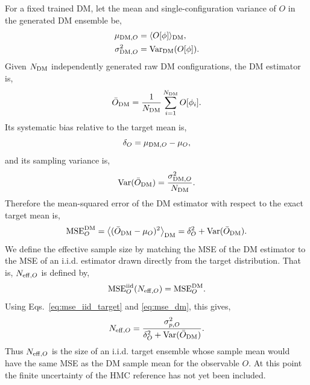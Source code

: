 \documentclass[reprint,twocolumn,superscriptaddress,preprintnumbers,amsmath,amssymb,aps,prd,floatfix]{revtex4-2}
\begin{document}
For a fixed trained DM, let the mean and single-configuration variance of $O$ in the generated DM ensemble be,
\begin{equation}
\begin{aligned}
\mu_{{\rm DM},O}
&=
\langle O[\phi]\rangle_{\rm DM},\\
\sigma_{{\rm DM},O}^2
&=
\mathrm{Var}_{\rm DM}(O[\phi]).
\end{aligned}
\label{eq:dm_mean_var}
\end{equation}
Given $N_{\rm DM}$ independently generated raw DM configurations, the DM estimator is,
\begin{equation}
\bar O_{\rm DM}
=
\frac{1}{N_{\rm DM}}\sum_{i=1}^{N_{\rm DM}}O[\phi_i].
\label{eq:dm_estimator}
\end{equation}
Its systematic bias relative to the target mean is,
\begin{equation}
\delta_O
=
\mu_{{\rm DM},O}-\mu_O,
\label{eq:dm_bias}
\end{equation}
and its sampling variance is,
\begin{equation}
\mathrm{Var}(\bar O_{\rm DM})
=
\frac{\sigma_{{\rm DM},O}^2}{N_{\rm DM}}.
\label{eq:dm_sampling_variance}
\end{equation}
Therefore the mean-squared error of the DM estimator with respect to the exact target mean is,
\begin{equation}
{\rm MSE}_O^{\rm DM}
=
\left\langle
(\bar O_{\rm DM}-\mu_O)^2
\right\rangle_{\rm DM}
=
\delta_O^2+\mathrm{Var}(\bar O_{\rm DM}).
\label{eq:mse_dm}
\end{equation}
We define the effective sample size by matching the MSE of the DM estimator to the MSE of an i.i.d. estimator drawn directly from the target distribution. That is, $N_{{\rm eff},O}$ is defined by,
\begin{equation}
{\rm MSE}^{\rm iid}_{O}(N_{{\rm eff},O})
=
{\rm MSE}_O^{\rm DM}.
\label{eq:neff_matching_condition}
\end{equation}
Using Eqs.~\eqref{eq:mse_iid_target} and \eqref{eq:mse_dm}, this gives,
\begin{equation}
N_{{\rm eff},O}
=
\frac{\sigma_{p,O}^2}{\delta_O^2+\mathrm{Var}(\bar O_{\rm DM})}.
\label{eq:neff_pure}
\end{equation}
Thus $N_{{\rm eff},O}$ is the size of an i.i.d. target ensemble whose sample mean would have the same MSE as the DM sample mean for the observable $O$. At this point the finite uncertainty of the HMC reference has not yet been included.
\end{document}
